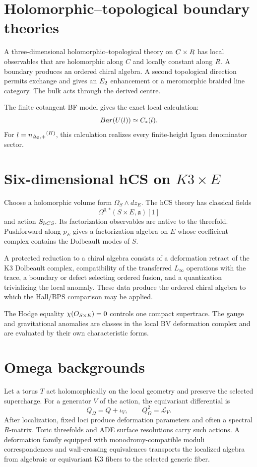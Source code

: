 \chapter{Holomorphic--topological boundary theories}
A three-dimensional holomorphic--topological theory on $C\times R$ has local observables that are holomorphic along $C$ and locally constant along $R$. A boundary produces an ordered chiral algebra. A second topological direction permits exchange and gives an $E_2$ enhancement or a meromorphic braided line category. The bulk acts through the derived centre.

The finite cotangent BF model gives the exact local calculation:
\[
 Bar(U(l))\simeq C_*(l).
\]
For $l={n_{\Delta_5,+}}^{(H)}$, this calculation realizes every finite-height Igusa denominator sector.

\chapter{Six-dimensional hCS on \texorpdfstring{$K3\times E$}{K3 x E}}
Choose a holomorphic volume form $\Omega_S\wedge dz_E$. The hCS theory has classical fields
\[
 \Omega^{0,*}(S\times E,\mathfrak a)[1]
\]
and action $S_{hCS}$. Its factorization observables are native to the threefold. Pushforward along $p_E$ gives a factorization algebra on $E$ whose coefficient complex contains the Dolbeault modes of $S$.

A protected reduction to a chiral algebra consists of a deformation retract of the K3 Dolbeault complex, compatibility of the transferred $L_\infty$ operations with the trace, a boundary or defect selecting ordered fusion, and a quantization trivializing the local anomaly. These data produce the ordered chiral algebra to which the Hall/BPS comparison may be applied.

The Hodge equality $\chi(O_{S\times E})=0$ controls one compact supertrace. The gauge and gravitational anomalies are classes in the local BV deformation complex and are evaluated by their own characteristic forms.

\chapter{Omega backgrounds}
Let a torus $T$ act holomorphically on the local geometry and preserve the selected supercharge. For a generator $V$ of the action, the equivariant differential is
\[
 Q_\Omega=Q+\iota_V,
 \qquad Q_\Omega^2=\mathcal L_V.
\]
After localization, fixed loci produce deformation parameters and often a spectral $R$-matrix. Toric threefolds and ADE surface resolutions carry such actions. A deformation family equipped with monodromy-compatible moduli correspondences and wall-crossing equivalences transports the localized algebra from algebraic or equivariant K3 fibers to the selected generic fiber.

